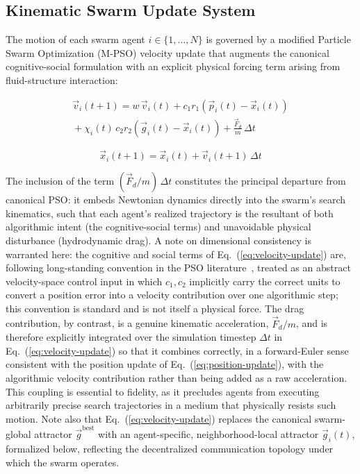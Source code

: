 \documentclass[journal]{IEEEtran}
\begin{document}
\subsection{Kinematic Swarm Update System}
\label{sec:kinematic}

The motion of each swarm agent $i \in \{1, \dots, N\}$ is governed by a modified Particle Swarm Optimization (M-PSO) velocity update that augments the canonical cognitive-social formulation with an explicit physical forcing term arising from fluid-structure interaction:

\begin{multline}
\vec{v}_i(t+1) = w\,\vec{v}_i(t) + c_1 r_1 \left(\vec{p}_i(t) - \vec{x}_i(t)\right) \\
{} + \chi_i(t)\, c_2 r_2 \left(\vec{g}_i(t) - \vec{x}_i(t)\right) + \frac{\vec{F}_d}{m}\,\Delta t
\label{eq:velocity-update}
\end{multline}

\begin{equation}
\vec{x}_i(t+1) = \vec{x}_i(t) + \vec{v}_i(t+1)\,\Delta t
\label{eq:position-update}
\end{equation}

The inclusion of the term $(\vec{F}_d / m)\,\Delta t$ constitutes the principal departure from canonical PSO: it embeds Newtonian dynamics directly into the swarm's search kinematics, such that each agent's realized trajectory is the resultant of both algorithmic intent (the cognitive-social terms) and unavoidable physical disturbance (hydrodynamic drag). A note on dimensional consistency is warranted here: the cognitive and social terms of Eq.~(\ref{eq:velocity-update}) are, following long-standing convention in the PSO literature~\cite{pso_canonical,shi_eberhart_1998}, treated as an abstract velocity-space control input in which $c_1, c_2$ implicitly carry the correct units to convert a position error into a velocity contribution over one algorithmic step; this convention is standard and is not itself a physical force. The drag contribution, by contrast, is a genuine kinematic acceleration, $\vec{F}_d/m$, and is therefore explicitly integrated over the simulation timestep $\Delta t$ in Eq.~(\ref{eq:velocity-update}) so that it combines correctly, in a forward-Euler sense consistent with the position update of Eq.~(\ref{eq:position-update}), with the algorithmic velocity contribution rather than being added as a raw acceleration. This coupling is essential to fidelity, as it precludes agents from executing arbitrarily precise search trajectories in a medium that physically resists such motion. Note also that Eq.~(\ref{eq:velocity-update}) replaces the canonical swarm-global attractor $\vec{g}^{\text{best}}$ with an agent-specific, neighborhood-local attractor $\vec{g}_i(t)$, formalized below, reflecting the decentralized communication topology under which the swarm operates.
\end{document}
